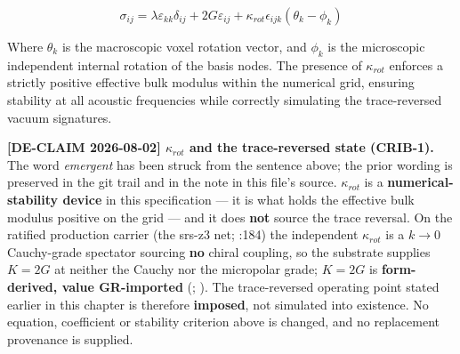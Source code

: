 \begin{equation}
    \sigma_{ij} = \lambda \varepsilon_{kk} \delta_{ij} + 2G \varepsilon_{ij} + \kappa_{rot} \epsilon_{ijk} (\theta_k - \phi_k)
\end{equation}

Where $\theta_k$ is the macroscopic voxel rotation vector, and $\phi_k$ is the microscopic independent internal rotation of the basis nodes. The presence of $\kappa_{rot}$ enforces a strictly positive effective bulk modulus within the numerical grid, ensuring stability at all acoustic frequencies while correctly simulating the trace-reversed vacuum signatures.

\noindent\textbf{[DE-CLAIM 2026-08-02] $\kappa_{rot}$ and the trace-reversed state (CRIB-1).} The word \emph{emergent} has been struck from the sentence above; the prior wording is preserved in the git trail and in the note in this file's source. $\kappa_{rot}$ is a \textbf{numerical-stability device} in this specification --- it is what holds the effective bulk modulus positive on the grid --- and it does \textbf{not} source the trace reversal. On the ratified production carrier (the srs-z3 net; :184) the independent $\kappa_{rot}$ is a $k \to 0$ Cauchy-grade spectator sourcing \textbf{no} chiral coupling, so the substrate supplies $K = 2G$ at neither the Cauchy nor the micropolar grade; $K = 2G$ is \textbf{form-derived, value GR-imported} (; ). The trace-reversed operating point stated earlier in this chapter is therefore \textbf{imposed}, not simulated into existence. No equation, coefficient or stability criterion above is changed, and no replacement provenance is supplied.


